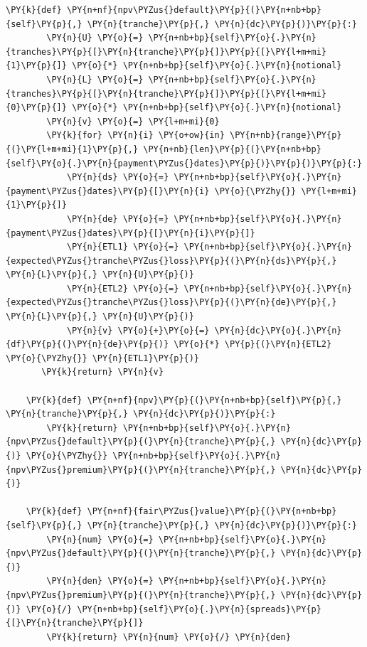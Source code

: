 \begin{tcolorbox}[breakable, size=fbox, boxrule=1pt, pad at break*=1mm,colback=cellbackground, colframe=cellborder]
\begin{Verbatim}[commandchars=\\\{\}]
    \PY{k}{def} \PY{n+nf}{npv\PYZus{}default}\PY{p}{(}\PY{n+nb+bp}{self}\PY{p}{,} \PY{n}{tranche}\PY{p}{,} \PY{n}{dc}\PY{p}{)}\PY{p}{:}
        \PY{n}{U} \PY{o}{=} \PY{n+nb+bp}{self}\PY{o}{.}\PY{n}{tranches}\PY{p}{[}\PY{n}{tranche}\PY{p}{]}\PY{p}{[}\PY{l+m+mi}{1}\PY{p}{]} \PY{o}{*} \PY{n+nb+bp}{self}\PY{o}{.}\PY{n}{notional}
        \PY{n}{L} \PY{o}{=} \PY{n+nb+bp}{self}\PY{o}{.}\PY{n}{tranches}\PY{p}{[}\PY{n}{tranche}\PY{p}{]}\PY{p}{[}\PY{l+m+mi}{0}\PY{p}{]} \PY{o}{*} \PY{n+nb+bp}{self}\PY{o}{.}\PY{n}{notional}
        \PY{n}{v} \PY{o}{=} \PY{l+m+mi}{0}
        \PY{k}{for} \PY{n}{i} \PY{o+ow}{in} \PY{n+nb}{range}\PY{p}{(}\PY{l+m+mi}{1}\PY{p}{,} \PY{n+nb}{len}\PY{p}{(}\PY{n+nb+bp}{self}\PY{o}{.}\PY{n}{payment\PYZus{}dates}\PY{p}{)}\PY{p}{)}\PY{p}{:}
            \PY{n}{ds} \PY{o}{=} \PY{n+nb+bp}{self}\PY{o}{.}\PY{n}{payment\PYZus{}dates}\PY{p}{[}\PY{n}{i} \PY{o}{\PYZhy{}} \PY{l+m+mi}{1}\PY{p}{]}
            \PY{n}{de} \PY{o}{=} \PY{n+nb+bp}{self}\PY{o}{.}\PY{n}{payment\PYZus{}dates}\PY{p}{[}\PY{n}{i}\PY{p}{]}
            \PY{n}{ETL1} \PY{o}{=} \PY{n+nb+bp}{self}\PY{o}{.}\PY{n}{expected\PYZus{}tranche\PYZus{}loss}\PY{p}{(}\PY{n}{ds}\PY{p}{,} \PY{n}{L}\PY{p}{,} \PY{n}{U}\PY{p}{)}
            \PY{n}{ETL2} \PY{o}{=} \PY{n+nb+bp}{self}\PY{o}{.}\PY{n}{expected\PYZus{}tranche\PYZus{}loss}\PY{p}{(}\PY{n}{de}\PY{p}{,} \PY{n}{L}\PY{p}{,} \PY{n}{U}\PY{p}{)}
            \PY{n}{v} \PY{o}{+}\PY{o}{=} \PY{n}{dc}\PY{o}{.}\PY{n}{df}\PY{p}{(}\PY{n}{de}\PY{p}{)} \PY{o}{*} \PY{p}{(}\PY{n}{ETL2} \PY{o}{\PYZhy{}} \PY{n}{ETL1}\PY{p}{)}
       \PY{k}{return} \PY{n}{v}
		
    \PY{k}{def} \PY{n+nf}{npv}\PY{p}{(}\PY{n+nb+bp}{self}\PY{p}{,} \PY{n}{tranche}\PY{p}{,} \PY{n}{dc}\PY{p}{)}\PY{p}{:}
        \PY{k}{return} \PY{n+nb+bp}{self}\PY{o}{.}\PY{n}{npv\PYZus{}default}\PY{p}{(}\PY{n}{tranche}\PY{p}{,} \PY{n}{dc}\PY{p}{)} \PY{o}{\PYZhy{}} \PY{n+nb+bp}{self}\PY{o}{.}\PY{n}{npv\PYZus{}premium}\PY{p}{(}\PY{n}{tranche}\PY{p}{,} \PY{n}{dc}\PY{p}{)}
		
    \PY{k}{def} \PY{n+nf}{fair\PYZus{}value}\PY{p}{(}\PY{n+nb+bp}{self}\PY{p}{,} \PY{n}{tranche}\PY{p}{,} \PY{n}{dc}\PY{p}{)}\PY{p}{:}
        \PY{n}{num} \PY{o}{=} \PY{n+nb+bp}{self}\PY{o}{.}\PY{n}{npv\PYZus{}default}\PY{p}{(}\PY{n}{tranche}\PY{p}{,} \PY{n}{dc}\PY{p}{)}
        \PY{n}{den} \PY{o}{=} \PY{n+nb+bp}{self}\PY{o}{.}\PY{n}{npv\PYZus{}premium}\PY{p}{(}\PY{n}{tranche}\PY{p}{,} \PY{n}{dc}\PY{p}{)} \PY{o}{/} \PY{n+nb+bp}{self}\PY{o}{.}\PY{n}{spreads}\PY{p}{[}\PY{n}{tranche}\PY{p}{]}
        \PY{k}{return} \PY{n}{num} \PY{o}{/} \PY{n}{den}
\end{Verbatim}
\end{tcolorbox}

